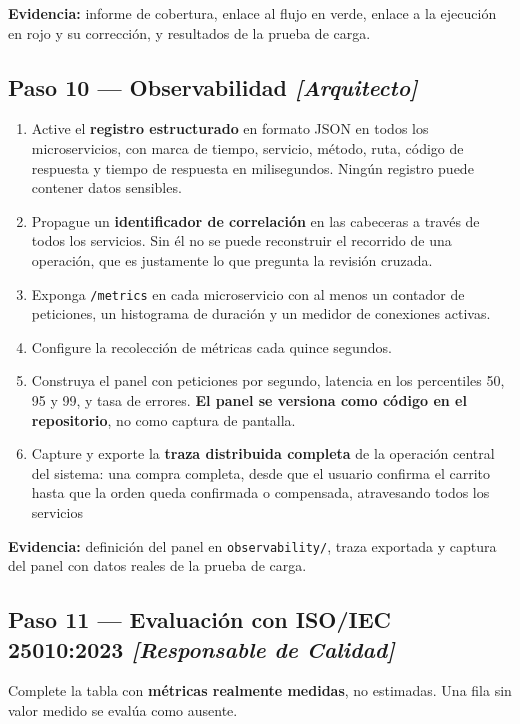 \documentclass[11pt,a4paper]{article}
\newcommand{\paso}[1]{\subsection{#1}}
\begin{document}
	\textbf{Evidencia:} informe de cobertura, enlace al flujo en verde, enlace a la ejecución en rojo y su corrección, y resultados de la prueba de carga.
	
	\paso{Paso 10 --- Observabilidad \emph{[Arquitecto]}}
	
	\begin{enumerate}[leftmargin=*,itemsep=4pt]
		\item Active el \textbf{registro estructurado} en formato JSON en todos los microservicios, con marca de tiempo, servicio, método, ruta, código de respuesta y tiempo de respuesta en milisegundos. Ningún registro puede contener datos sensibles.
		\item Propague un \textbf{identificador de correlación} en las cabeceras a través de todos los servicios. Sin él no se puede reconstruir el recorrido de una operación, que es justamente lo que pregunta la revisión cruzada.
		\item Exponga \texttt{/metrics} en cada microservicio con al menos un contador de peticiones, un histograma de duración y un medidor de conexiones activas.
		\item Configure la recolección de métricas cada quince segundos.
		\item Construya el panel con peticiones por segundo, latencia en los percentiles 50, 95 y 99, y tasa de errores. \textbf{El panel se versiona como código en el repositorio}, no como captura de pantalla.
		\item Capture y exporte la \textbf{traza distribuida completa} de la operación central del sistema: una compra completa, desde que el usuario confirma el carrito hasta que la orden queda confirmada o compensada, atravesando todos los servicios
	\end{enumerate}
	
	\textbf{Evidencia:} definición del panel en \texttt{observability/}, traza exportada y captura del panel con datos reales de la prueba de carga.
	
	\paso{Paso 11 --- Evaluación con ISO/IEC 25010:2023 \emph{[Responsable de Calidad]}}
	
	Complete la tabla con \textbf{métricas realmente medidas}, no estimadas. Una fila sin valor medido se evalúa como ausente.
	
\end{document}
